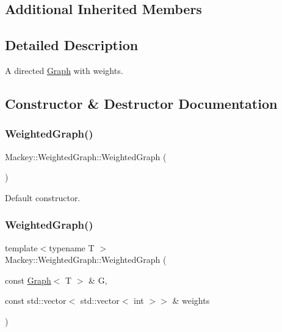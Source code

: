 \subsection*{Additional Inherited Members}


\subsection{Detailed Description}
A directed \hyperlink{classMackey_1_1Graph}{Graph} with weights. 

\subsection{Constructor \& Destructor Documentation}
\mbox{\label{classMackey_1_1WeightedGraph_afed3bc23878489313a0bf8770898759a}} 
\subsubsection{\texorpdfstring{Weighted\+Graph()}{WeightedGraph()}\hspace{0.1cm}{\footnotesize\ttfamily [1/4]}}
{\footnotesize\ttfamily Mackey\+::\+Weighted\+Graph\+::\+Weighted\+Graph (\begin{DoxyParamCaption}{ }\end{DoxyParamCaption})\hspace{0.3cm}{\ttfamily [inline]}}



Default constructor. 

\mbox{\label{classMackey_1_1WeightedGraph_a6fdc546502bdee09851186ea582cf496}} 
\subsubsection{\texorpdfstring{Weighted\+Graph()}{WeightedGraph()}\hspace{0.1cm}{\footnotesize\ttfamily [2/4]}}
{\footnotesize\ttfamily template$<$typename T $>$ \\
Mackey\+::\+Weighted\+Graph\+::\+Weighted\+Graph (\begin{DoxyParamCaption}\item[{const \hyperlink{classMackey_1_1Graph}{Graph}$<$ T $>$ \&}]{G,  }\item[{const std\+::vector$<$ std\+::vector$<$ int $>$$>$ \&}]{weights }\end{DoxyParamCaption})}



